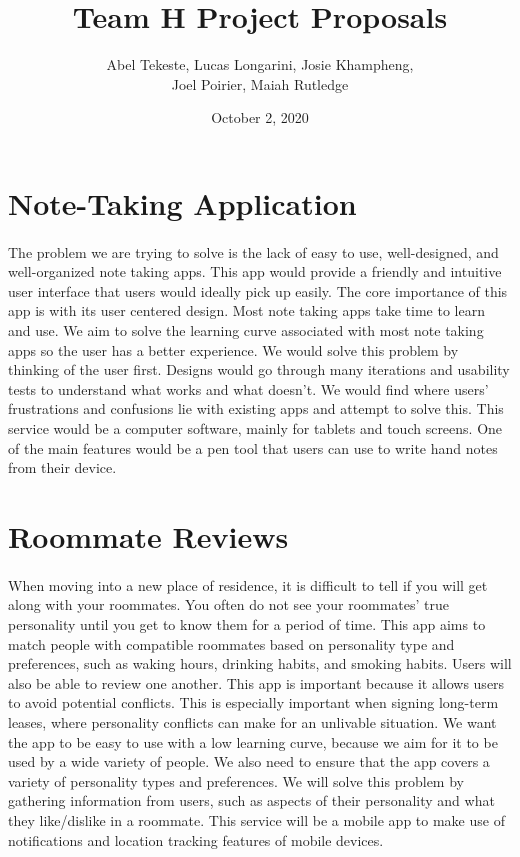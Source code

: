 \documentclass{article}
\title{Team H Project Proposals}
\author{Abel Tekeste, Lucas Longarini, Josie Khampheng,
\\Joel Poirier, Maiah Rutledge}
\date{October 2, 2020}
\begin{document}
\maketitle

\section{Note-Taking Application}
\paragraph{}
The problem we are trying to solve is the lack of easy to use, well-designed, and well-organized note taking apps. This app would provide a friendly and intuitive user interface that users would ideally pick up easily.
The core importance of this app is with its user centered design. Most note taking apps take time to learn and use. We aim to solve the learning curve associated with most note taking apps so the user has a better experience.
We would solve this problem by thinking of the user first. Designs would go through many iterations and usability tests to understand what works and what doesn’t.
We would find where users' frustrations and confusions lie with existing apps and attempt to solve this. This service would be a computer software, mainly for tablets and touch screens.
One of the main features would be a pen tool that users can use to write hand notes from their device.

\section{Roommate Reviews}
\paragraph{}
When moving into a new place of residence, it is difficult to tell if you will get along with your roommates.  You often do not see your roommates' true personality until you get to know them for a period of time.
This app aims to match people with compatible roommates based on personality type and preferences, such as waking hours, drinking habits, and smoking habits. Users will also be able to review one another.
This app is important because it allows users to avoid potential conflicts. This is especially important when signing long-term leases, where personality conflicts can make for an unlivable situation.
We want the app to be easy to use with a low learning curve, because we aim for it to be used by a wide variety of people. We also need to ensure that the app covers a variety of personality types and preferences.
We will solve this problem by gathering information from users, such as aspects of their personality and what they like/dislike in a roommate. 
This service will be a mobile app to make use of notifications and location tracking features of mobile devices.
\end{document}
